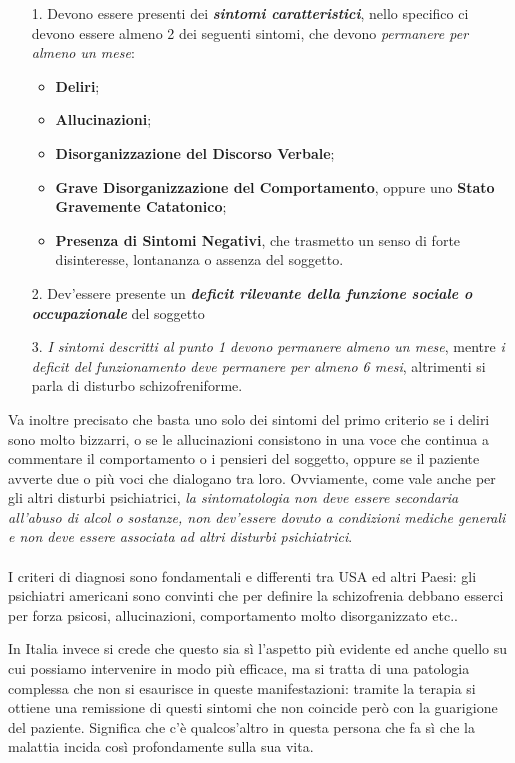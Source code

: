 \begin{itemize}
\item[1.]
  Devono essere presenti dei \textbf{\emph{sintomi caratteristici}},
  nello specifico ci devono essere almeno 2 dei seguenti sintomi, che
  devono \emph{permanere per almeno un mese}:

\begin{itemize}
\item
  \textbf{Deliri};
\item
  \textbf{Allucinazioni};
\item
  \textbf{Disorganizzazione del Discorso Verbale};
\item
  \textbf{Grave Disorganizzazione del Comportamento}, oppure uno
  \textbf{Stato Gravemente Catatonico};
\item
  \textbf{Presenza di Sintomi Negativi}, che trasmetto un senso di forte
  disinteresse, lontananza o assenza del soggetto.
\end{itemize}

\item[2.]
  Dev'essere presente un \textbf{\emph{deficit rilevante della funzione
  sociale o occupazionale}} del soggetto
\item[3.]
  \emph{I sintomi descritti al punto 1 devono permanere almeno un mese},
  mentre \emph{i deficit del funzionamento deve permanere per almeno 6
  mesi}, altrimenti si parla di disturbo schizofreniforme.
\end{itemize}

Va inoltre precisato che basta uno solo dei sintomi del primo criterio
se i deliri sono molto bizzarri, o se le allucinazioni consistono in una
voce che continua a commentare il comportamento o i pensieri del
soggetto, oppure se il paziente avverte due o più voci che dialogano tra
loro. Ovviamente, come vale anche per gli altri disturbi psichiatrici,
\emph{la sintomatologia non deve essere secondaria all'abuso di alcol o
sostanze, non dev'essere dovuto a condizioni mediche generali e non deve
essere associata ad altri disturbi psichiatrici}.
\\\\
I criteri di diagnosi sono fondamentali e differenti tra USA ed altri
Paesi: gli psichiatri americani sono convinti che per definire la
schizofrenia debbano esserci per forza psicosi, allucinazioni,
comportamento molto disorganizzato etc..

In Italia invece si crede che questo sia sì l'aspetto più evidente ed
anche quello su cui possiamo intervenire in modo più efficace, ma si
tratta di una patologia complessa che non si esaurisce in queste
manifestazioni: tramite la terapia si ottiene una remissione di questi
sintomi che non coincide però con la guarigione del paziente. Significa
che c'è qualcos'altro in questa persona che fa sì che la malattia incida
così profondamente sulla sua vita.

